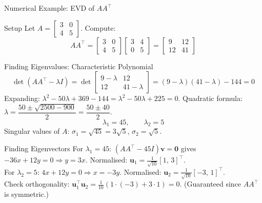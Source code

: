 \documentclass{beamer}
\begin{document}
\begin{frame}[shrink=10]{Numerical Example: EVD of $AA^\top$}
  \begin{block}{Setup}
    Let $A = \begin{bmatrix} 3 & 0\\ 4 & 5 \end{bmatrix}$.
    Compute:
    \[
      AA^\top
        = \begin{bmatrix}3&0\\4&5\end{bmatrix}
          \begin{bmatrix}3&4\\0&5\end{bmatrix}
        = \begin{bmatrix}9&12\\12&41\end{bmatrix}
    \]
  \end{block}

  \begin{block}{Finding Eigenvalues: Characteristic Polynomial}
    \[
      \det(AA^\top - \lambda I)
        = \det\begin{bmatrix}9-\lambda & 12\\ 12 & 41-\lambda\end{bmatrix}
        = (9-\lambda)(41-\lambda) - 144 = 0
    \]
    Expanding: $\lambda^2 - 50\lambda + 369 - 144 = \lambda^2 - 50\lambda + 225 = 0$.
    Quadratic formula:
    $\lambda = \dfrac{50 \pm \sqrt{2500 - 900}}{2} = \dfrac{50 \pm 40}{2}$.
    \[
      \lambda_1 = 45,\qquad \lambda_2 = 5
    \]
    Singular values of $A$: $\sigma_1 = \sqrt{45} = 3\sqrt{5}$,\;
    $\sigma_2 = \sqrt{5}$.
  \end{block}

  \begin{block}{Finding Eigenvectors}
    For $\lambda_1 = 45$: $(AA^\top - 45I)\mathbf{v} = \mathbf{0}$
    gives $-36x + 12y = 0 \Rightarrow y = 3x$.
    Normalised: $\mathbf{u}_1 = \frac{1}{\sqrt{10}}[1,\,3]^\top$.\\[4pt]
    For $\lambda_2 = 5$: $4x + 12y = 0 \Rightarrow x = -3y$.
    Normalised: $\mathbf{u}_2 = \frac{1}{\sqrt{10}}[-3,\,1]^\top$.\\[4pt]
    Check orthogonality: $\mathbf{u}_1^\top\mathbf{u}_2
    = \frac{1}{10}(1\cdot(-3) + 3\cdot 1) = 0$.\;\checkmark\quad
    (Guaranteed since $AA^\top$ is symmetric.)
  \end{block}
\end{frame}
\end{document}
